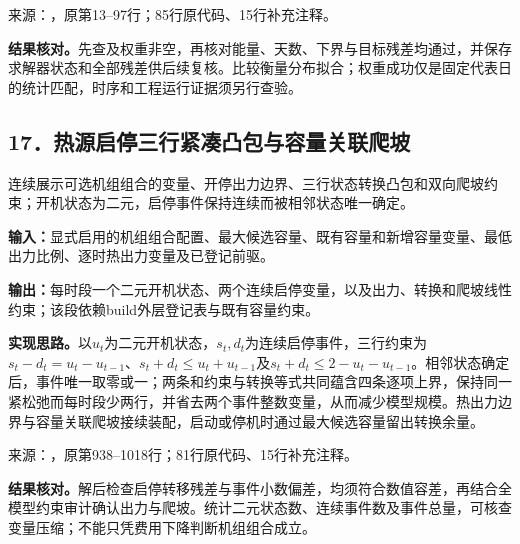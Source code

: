 {\small 来源：，原第13--97行；85行原代码、15行补充注释。}\par

\begingroup
{}

\endgroup

\noindent\textbf{结果核对。}先查及权重非空，再核对能量、天数、下界与目标残差均通过，并保存求解器状态和全部残差供后续复核。比较衡量分布拟合；权重成功仅是固定代表日的统计匹配，时序和工程运行证据须另行查验。

\subsection*{17．热源启停三行紧凑凸包与容量关联爬坡}
连续展示可选机组组合的变量、开停出力边界、三行状态转换凸包和双向爬坡约束；开机状态为二元，启停事件保持连续而被相邻状态唯一确定。

\noindent\textbf{输入：}显式启用的机组组合配置、最大候选容量、既有容量和新增容量变量、最低出力比例、逐时热出力变量及已登记前驱。\par
\noindent\textbf{输出：}每时段一个二元开机状态、两个连续启停变量，以及出力、转换和爬坡线性约束；该段依赖build外层登记表与既有容量约束。\par

\noindent\textbf{实现思路。}以$u_t$为二元开机状态，$s_t,d_t$为连续启停事件，三行约束为$s_t-d_t=u_t-u_{t-1}$、$s_t+d_t\le u_t+u_{t-1}$及$s_t+d_t\le2-u_t-u_{t-1}$。相邻状态确定后，事件唯一取零或一；两条和约束与转换等式共同蕴含四条逐项上界，保持同一紧松弛而每时段少两行，并省去两个事件整数变量，从而减少模型规模。热出力边界与容量关联爬坡接续装配，启动或停机时通过最大候选容量留出转换余量。

{\small 来源：，原第938--1018行；81行原代码、15行补充注释。}\par

\begingroup
{}

\endgroup

\noindent\textbf{结果核对。}解后检查启停转移残差与事件小数偏差，均须符合数值容差，再结合全模型约束审计确认出力与爬坡。统计二元状态数、连续事件数及事件总量，可核查变量压缩；不能只凭费用下降判断机组组合成立。
